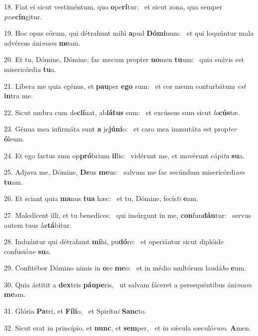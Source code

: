 18. Fiat ei sicut vestiméntum, quo \textbf{o}pe\textbf{rí}tur: \ast\  et sicut zona, qua semper \textit{præ}\textbf{cín}gitur.\

19. Hoc opus eórum, qui détrahunt mihi \textbf{a}pud \textbf{Dó}\textbf{mi}num: \ast\  et qui loquúntur mala advérsus áni\textit{mam} \textbf{me}am.\

20. Et tu, Dómine, Dómine, fac mecum propter \textbf{no}men \textbf{tu}um: \ast\  quia suávis est misericórdi\textit{a} \textbf{tu}a.\

21. Líbera me quia egénus, et \textbf{pau}per \textbf{e}\textbf{go} sum: \ast\  et cor meum conturbátum \textit{est} \textbf{in}tra me.\

22. Sicut umbra cum de\textbf{clí}nat, ab\textbf{lá}\textbf{tus} sum: \ast\  et excússus sum sicut \textit{lo}\textbf{cús}tæ.\

23. Génua mea infirmáta sunt \textbf{a} je\textbf{jú}\textbf{ni}o: \ast\  et caro mea immutáta est prop\textit{ter} \textbf{ó}leum.\

24. Et ego factus sum op\textbf{pró}brium \textbf{il}lis: \ast\  vidérunt me, et movérunt cápi\textit{ta} \textbf{su}a.\

25. Adjuva me, Dómine, \textbf{De}us \textbf{me}us: \ast\  salvum me fac secúndum misericórdi\textit{am} \textbf{tu}am.\

26. Et sciant quia \textbf{ma}nus \textbf{tu}\textbf{a} hæc: \ast\  et tu, Dómine, fecís\textit{ti} \textbf{e}am.\

27. Maledícent illi, et tu benedíces: \dag\  qui insúrgunt in me, \textbf{con}fun\textbf{dán}tur: \ast\  servus autem tuus \textit{læ}\textbf{tá}bitur.\

28. Induántur qui détrahunt \textbf{mi}hi, pu\textbf{dó}re: \ast\  et operiántur sicut diplóide confusió\textit{ne} \textbf{su}a.\

29. Confitébor Dómino nimis in \textbf{o}re \textbf{me}o: \ast\  et in médio multórum laudá\textit{bo} \textbf{e}um.\

30. Quia ástitit a \textbf{dex}tris \textbf{páu}\textbf{pe}ris, \ast\  ut salvam fáceret a persequéntibus áni\textit{mam} \textbf{me}am.\

31. Glória \textbf{Pa}tri, et \textbf{Fí}\textbf{li}o, \ast\  et Spirítu\textit{i} \textbf{Sanc}to.\

32. Sicut erat in princípio, et \textbf{nunc}, et \textbf{sem}per, \ast\  et in sǽcula sæculó\textit{rum}. \textbf{A}men.\

